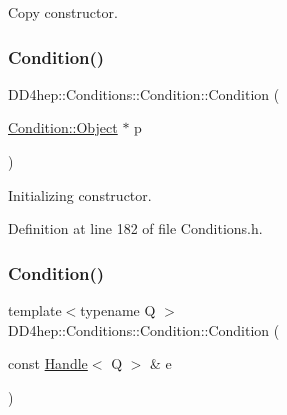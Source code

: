 Copy constructor. 

\hypertarget{class_d_d4hep_1_1_conditions_1_1_condition_a6bd06500c7a9dce845e676d6370ad3c3}{}\label{class_d_d4hep_1_1_conditions_1_1_condition_a6bd06500c7a9dce845e676d6370ad3c3} 
\subsubsection{\texorpdfstring{Condition()}{Condition()}\hspace{0.1cm}{\footnotesize\ttfamily [3/5]}}
{\footnotesize\ttfamily D\+D4hep\+::\+Conditions\+::\+Condition\+::\+Condition (\begin{DoxyParamCaption}\item[{\hyperlink{class_d_d4hep_1_1_conditions_1_1_condition_a6fc8dae0dad41db6a237920c85f8a55d}{Condition\+::\+Object} $\ast$}]{p }\end{DoxyParamCaption})\hspace{0.3cm}{\ttfamily [inline]}}



Initializing constructor. 



Definition at line 182 of file Conditions.\+h.

\hypertarget{class_d_d4hep_1_1_conditions_1_1_condition_adcc56a3880cb03ff766ee5312d06e2f5}{}\label{class_d_d4hep_1_1_conditions_1_1_condition_adcc56a3880cb03ff766ee5312d06e2f5} 
\subsubsection{\texorpdfstring{Condition()}{Condition()}\hspace{0.1cm}{\footnotesize\ttfamily [4/5]}}
{\footnotesize\ttfamily template$<$typename Q $>$ \\
D\+D4hep\+::\+Conditions\+::\+Condition\+::\+Condition (\begin{DoxyParamCaption}\item[{const \hyperlink{class_d_d4hep_1_1_handle}{Handle}$<$ Q $>$ \&}]{e }\end{DoxyParamCaption})\hspace{0.3cm}{\ttfamily [inline]}}



